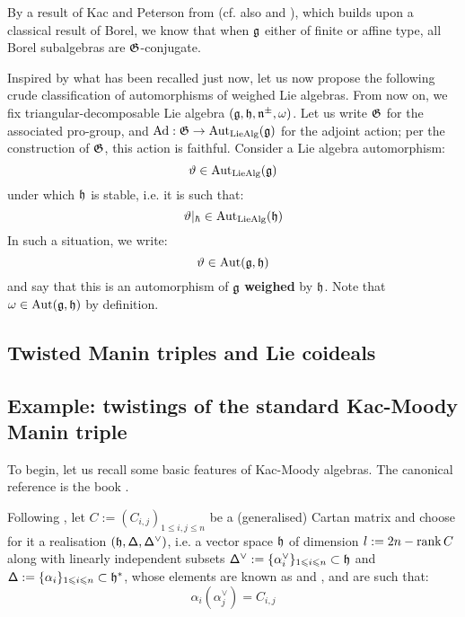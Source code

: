         By a result of Kac and Peterson from \cite{kac_peterson_infinite_flag_varieties_and_conjugacy_of_cartan_subalgebras} (cf. also \cite{chernousov_egorov_gille_pianzola_cohomological_proof_of_peterson_kac_theorem} and \cite{chernousov_neher_pianzola_conjugacy_of_cartan_subalgebras_in_EALAs_with_non_fgc_centreless_cores}), which builds upon a classical result of Borel, we know that when $\mathfrak{g}$ either of finite or affine type, all Borel subalgebras are $\mathfrak{G}$-conjugate.

        Inspired by what has been recalled just now, let us now propose the following crude classification of automorphisms of weighed Lie algebras. From now on, we fix triangular-decomposable Lie algebra $(\mathfrak{g}, \mathfrak{h}, \mathfrak{n}^{\pm}, \omega)$. Let us write $\mathfrak{G}$ for the associated pro-group, and $\mathrm{Ad}: \mathfrak{G} \to \operatorname{Aut}_{\mathrm{Lie}\mathrm{Alg}}(\mathfrak{g})$ for the adjoint action; per the construction of $\mathfrak{G}$, this action is faithful. Consider a Lie algebra automorphism:
            $$\vartheta \in \operatorname{Aut}_{\mathrm{Lie}\mathrm{Alg}}(\mathfrak{g})$$
        under which $\mathfrak{h}$ is stable, i.e. it is such that:
            $$\vartheta|_{\hbar} \in \operatorname{Aut}_{\mathrm{Lie}\mathrm{Alg}}(\mathfrak{h})$$
        In such a situation, we write:
            $$\vartheta \in \operatorname{Aut}(\mathfrak{g}, \mathfrak{h})$$
        and say that this is an automorphism of $\mathfrak{g}$ \textbf{weighed} by $\mathfrak{h}$. Note that $\omega \in \operatorname{Aut}(\mathfrak{g}, \mathfrak{h})$ by definition.
        \begin{definition} \label{def: automorphisms_of_types_I_and_II}
            
        \end{definition}

    \subsection{Twisted Manin triples and Lie coideals}

    \subsection{Example: twistings of the standard Kac-Moody Manin triple}
        To begin, let us recall some basic features of Kac-Moody algebras. The canonical reference is the book \cite{kac_infinite_dimensional_lie_algebras}.
        
        Following \cite[Chapter 1]{kac_infinite_dimensional_lie_algebras}, let $C := ( C_{i, j} )_{1 \leq i, j \leq n}$ be a (generalised) Cartan matrix and choose for it a realisation $(\mathfrak{h}, \mathsf{\Delta}, \mathsf{\Delta}^{\vee})$, i.e. a vector space $\mathfrak{h}$ of dimension $l := 2n - \operatorname{rank} C$ along with linearly independent subsets $\mathsf{\Delta}^{\vee} := \{ \alpha_i^{\vee} \}_{1 \leqslant i \leqslant n} \subset \mathfrak{h}$ and $\mathsf{\Delta} := \{ \alpha_i \}_{1 \leqslant i \leqslant n} \subset \mathfrak{h}^*$, whose elements are known as  and , and are such that:
            \begin{equation} \label{equation: cartan_matrix_entries}
                \alpha_i( \alpha_j^{\vee} ) = C_{i, j}
            \end{equation}

